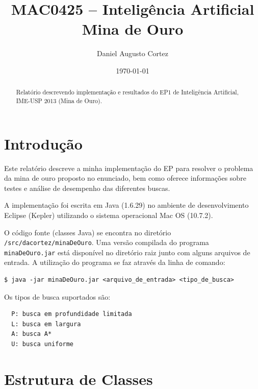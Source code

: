 \documentclass[12pt,a4paper]{article}
\newcommand{\zerar}{\setcounter{equation}{0}\setcounter{figure}{0}\setcounter{table}{0}}
\begin{document}
\title{{\sc MAC0425 -- Inteligência Artificial} \\ \vspace{0.5cm} {\bf Mina de Ouro}}
\author{Daniel Augusto Cortez}
\date{\today}

\maketitle

\begin{abstract}
Relatório descrevendo implementação e resultados do EP1 de Inteligência Artificial, IME-USP 2013
(Mina de Ouro).
\end{abstract}


\zerar
\section{Introdução}
\label{sec:intro}

Este relatório descreve a minha implementação do EP para resolver o problema da mina de ouro 
proposto no enunciado, bem como oferece informações sobre testes e análise de desempenho das 
diferentes buscas.

A implementação foi escrita em Java (1.6.29) no ambiente de desenvolvimento Eclipse (Kepler) 
utilizando o sistema operacional Mac OS (10.7.2).

O código fonte (classes Java) se encontra no diretório \verb|/src/dacortez/minaDeOuro|. Uma versão 
compilada do programa \verb|minaDeOuro.jar| está disponível no diretório raiz junto com alguns 
arquivos de entrada. A utilização do programa se faz através da linha de comando:
%
\begin{verbatim}
$ java -jar minaDeOuro.jar <arquivo_de_entrada> <tipo_de_busca>
\end{verbatim}
%
Os tipos de busca suportados são:
%
\begin{verbatim}
  P: busca em profundidade limitada
  L: busca em largura
  A: busca A*
  U: busca uniforme
\end{verbatim}


\zerar
\section{Estrutura de Classes}
\label{sec:classes}
\end{document}
